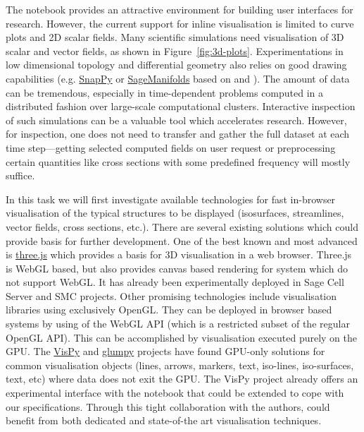 \begin{workpackage}
\begin{tasklist}
\begin{task}[title=Visualisation system for 3D data in web-notebook
,id=vis3d,lead=SR, partners={US,PS,USO}, PM=13, wphases=0-24, issue=76]

The \Jupyter notebook provides an attractive environment for building
user interfaces for research. However, the current support for inline
visualisation is limited to curve plots and 2D scalar fields. Many
scientific simulations need visualisation of 3D scalar and vector
fields, as shown in Figure~\ref{fig:3d-plots}.  Experimentations in
low dimensional topology and differential geometry also relies on good
drawing capabilities
(e.g. \href{http://www.math.uic.edu/t3m/SnapPy/}{SnapPy} or
\href{http://sagemanifolds.obspm.fr/}{SageManifolds} based on \IPython
and \Sage). The amount of data can be tremendous, especially in
time-dependent problems computed in a distributed fashion over
large-scale computational clusters. Interactive inspection of such
simulations can be a valuable tool which accelerates
research. However, for inspection, one does not need to transfer and
gather the full dataset at each time step---getting selected computed
fields on user request or preprocessing certain quantities like cross
sections with some predefined frequency will mostly suffice.

In this task we will first investigate available technologies for fast
in-browser visualisation of the typical structures to be displayed
(isosurfaces, streamlines, vector fields, cross sections, etc.).
There are several existing solutions which could provide basis for
further development. One of the best known and most advanced is
\href{http://threejs.org/}{three.js} which provides a basis for 3D
visualisation in a web browser. Three.js is WebGL based, but also
provides canvas based rendering for system which do not support
WebGL. It has already been experimentally deployed in Sage Cell Server
and SMC projects. Other promising technologies include visualisation
libraries using exclusively OpenGL. They can be deployed in browser
based systems by using of the WebGL API (which is a restricted subset
of the regular OpenGL API). This can be accomplished by visualisation
executed purely on the GPU. The \href{http://vispy.org/}{VisPy} and
\href{http://glumpy.github.io/}{glumpy} projects have found GPU-only
solutions for common visualisation objects (lines, arrows, markers,
text, iso-lines, iso-surfaces, text, etc) where data does not exit the
GPU. The VisPy project already offers an experimental interface with
the \Jupyter notebook that could be extended to cope with our
specifications. Through this tight collaboration with the authors,
\TheProject could benefit from both dedicated and state-of-the art
visualisation techniques.


\end{task}
\end{tasklist}
\end{workpackage}
